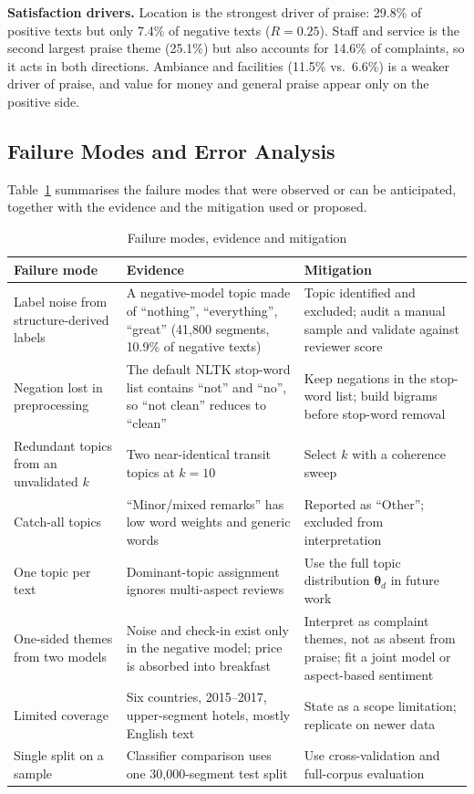 \documentclass[11pt,journal,draftclsnofoot,onecolumn]{IEEEtran}
\begin{document}
\textbf{Satisfaction drivers.} Location is the strongest driver of praise: 29.8\% of positive texts but only 7.4\% of negative texts ($R=0.25$). Staff and service is the second largest praise theme (25.1\%) but also accounts for 14.6\% of complaints, so it acts in both directions. Ambiance and facilities (11.5\% vs.\ 6.6\%) is a weaker driver of praise, and value for money and general praise appear only on the positive side.

\subsection{Failure Modes and Error Analysis}
Table~\ref{tab:fail} summarises the failure modes that were observed or can be anticipated, together with the evidence and the mitigation used or proposed.

\begin{table}[!t]
\caption{Failure modes, evidence and mitigation}
\label{tab:fail}
\centering
\footnotesize
\begin{tabular}{p{3.0cm}p{5.0cm}p{5.0cm}}
\toprule
Failure mode & Evidence & Mitigation \\
\midrule
Label noise from structure-derived labels & A negative-model topic made of ``nothing'', ``everything'', ``great'' (41,800 segments, 10.9\% of negative texts) & Topic identified and excluded; audit a manual sample and validate against reviewer score \\
Negation lost in preprocessing & The default NLTK stop-word list contains ``not'' and ``no'', so ``not clean'' reduces to ``clean'' & Keep negations in the stop-word list; build bigrams before stop-word removal \\
Redundant topics from an unvalidated $k$ & Two near-identical transit topics at $k=10$ & Select $k$ with a coherence sweep \\
Catch-all topics & ``Minor/mixed remarks'' has low word weights and generic words & Reported as ``Other''; excluded from interpretation \\
One topic per text & Dominant-topic assignment ignores multi-aspect reviews & Use the full topic distribution $\boldsymbol{\theta}_d$ in future work \\
One-sided themes from two models & Noise and check-in exist only in the negative model; price is absorbed into breakfast & Interpret as complaint themes, not as absent from praise; fit a joint model or aspect-based sentiment \\
Limited coverage & Six countries, 2015--2017, upper-segment hotels, mostly English text & State as a scope limitation; replicate on newer data \\
Single split on a sample & Classifier comparison uses one 30,000-segment test split & Use cross-validation and full-corpus evaluation \\
\bottomrule
\end{tabular}
\end{table}
\end{document}
